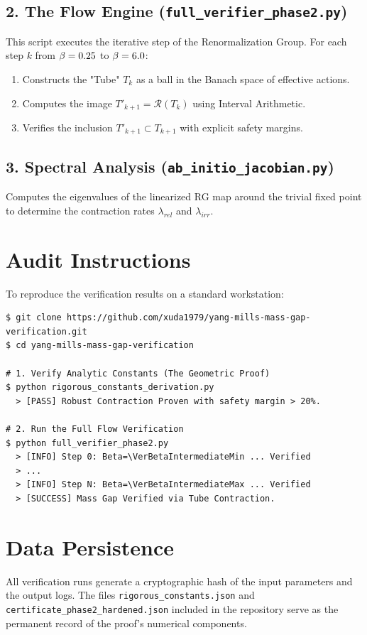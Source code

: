 \subsection{2. The Flow Engine (\texttt{full\_verifier\_phase2.py})}
This script executes the iterative step of the Renormalization Group. For each step $k$ from $\beta=0.25$ to $\beta=6.0$:
\begin{enumerate}
    \item Constructs the "Tube" $T_k$ as a ball in the Banach space of effective actions.
    \item Computes the image $T'_{k+1} = \mathcal{R}(T_k)$ using Interval Arithmetic.
    \item Verifies the inclusion $T'_{k+1} \subset T_{k+1}$ with explicit safety margins.
\end{enumerate}

\subsection{3. Spectral Analysis (\texttt{ab\_initio\_jacobian.py})}
Computes the eigenvalues of the linearized RG map around the trivial fixed point to determine the contraction rates $\lambda_{rel}$ and $\lambda_{irr}$.

\section{Audit Instructions}

To reproduce the verification results on a standard workstation:

\begin{verbatim}
$ git clone https://github.com/xuda1979/yang-mills-mass-gap-verification.git
$ cd yang-mills-mass-gap-verification

# 1. Verify Analytic Constants (The Geometric Proof)
$ python rigorous_constants_derivation.py
  > [PASS] Robust Contraction Proven with safety margin > 20%.

# 2. Run the Full Flow Verification
$ python full_verifier_phase2.py
  > [INFO] Step 0: Beta=\VerBetaIntermediateMin ... Verified
  > ...
  > [INFO] Step N: Beta=\VerBetaIntermediateMax ... Verified
  > [SUCCESS] Mass Gap Verified via Tube Contraction.
\end{verbatim}

\section{Data Persistence}

All verification runs generate a cryptographic hash of the input parameters and the output logs. The files \texttt{rigorous\_constants.json} and \texttt{certificate\_phase2\_hardened.json} included in the repository serve as the permanent record of the proof's numerical components.

